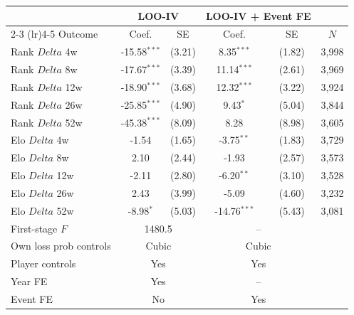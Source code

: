 \begin{tabular}{lccccc}
\toprule
 & \multicolumn{2}{c}{LOO-IV} & \multicolumn{2}{c}{LOO-IV + Event FE} \\
\cmidrule(lr){2-3} \cmidrule(lr){4-5}
Outcome & Coef. & SE & Coef. & SE & $N$ \\
\midrule
Rank $Delta$ 4w & -15.58$^{***}$ & (3.21) & 8.35$^{***}$ & (1.82) & 3,998 \\
Rank $Delta$ 8w & -17.67$^{***}$ & (3.39) & 11.14$^{***}$ & (2.61) & 3,969 \\
Rank $Delta$ 12w & -18.90$^{***}$ & (3.68) & 12.32$^{***}$ & (3.22) & 3,924 \\
Rank $Delta$ 26w & -25.85$^{***}$ & (4.90) & 9.43$^{*}$ & (5.04) & 3,844 \\
Rank $Delta$ 52w & -45.38$^{***}$ & (8.09) & 8.28 & (8.98) & 3,605 \\
Elo $Delta$ 4w & -1.54 & (1.65) & -3.75$^{**}$ & (1.83) & 3,729 \\
Elo $Delta$ 8w & 2.10 & (2.44) & -1.93 & (2.57) & 3,573 \\
Elo $Delta$ 12w & -2.11 & (2.80) & -6.20$^{**}$ & (3.10) & 3,528 \\
Elo $Delta$ 26w & 2.43 & (3.99) & -5.09 & (4.60) & 3,232 \\
Elo $Delta$ 52w & -8.98$^{*}$ & (5.03) & -14.76$^{***}$ & (5.43) & 3,081 \\
\midrule
First-stage $F$ & \multicolumn{2}{c}{1480.5} & \multicolumn{2}{c}{--} & \\
Own loss prob controls & \multicolumn{2}{c}{Cubic} & \multicolumn{2}{c}{Cubic} & \\
Player controls & \multicolumn{2}{c}{Yes} & \multicolumn{2}{c}{Yes} & \\
Year FE & \multicolumn{2}{c}{Yes} & \multicolumn{2}{c}{--} & \\
Event FE & \multicolumn{2}{c}{No} & \multicolumn{2}{c}{Yes} & \\
\bottomrule
\end{tabular}
